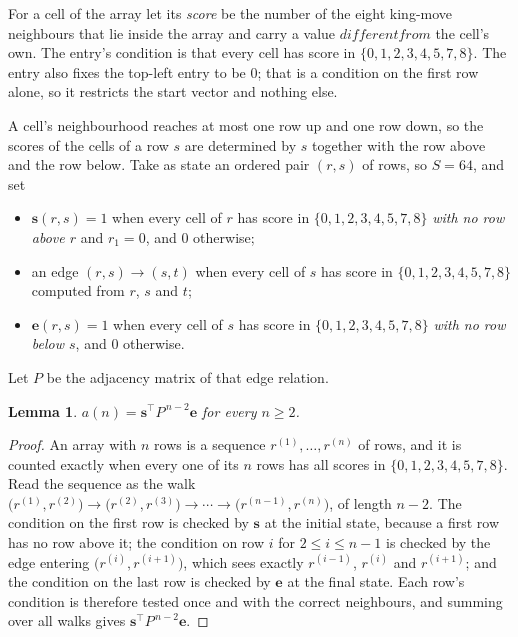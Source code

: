 \documentclass[11pt,a4paper]{article}
\theoremstyle{plain}
\newtheorem{lemma}[theorem]{Lemma}
\theoremstyle{definition}
\begin{document}
For a cell of the array let its \emph{score} be the number of the eight king-move neighbours that lie inside
the array and carry a value $different from$ the cell's own. The entry's condition is that every cell
has score in $\{0,1,2,3,4,5,7,8\}$. The entry also fixes the top-left entry to be $0$; that is a condition on the first row alone, so it restricts the start vector and nothing else.

A cell's neighbourhood reaches at most one row up and one row down, so the scores of the
cells of a row $s$ are determined by $s$ together with the row above and the row below.
Take as state an ordered pair $(r,s)$ of rows, so $S=64$, and set
\begin{itemize}
\item $\mathbf{s}(r,s)=1$ when every cell of $r$ has score in $\{0,1,2,3,4,5,7,8\}$ \emph{with no row
above $r$} and $r_1=0$, and $0$ otherwise;
\item an edge $(r,s)\to(s,t)$ when every cell of $s$ has score in $\{0,1,2,3,4,5,7,8\}$ computed from
$r$, $s$ and $t$;
\item $\mathbf{e}(r,s)=1$ when every cell of $s$ has score in $\{0,1,2,3,4,5,7,8\}$ \emph{with no row
below $s$}, and $0$ otherwise.
\end{itemize}
Let $P$ be the adjacency matrix of that edge relation.

\begin{lemma}\label{lem:walk}
$a(n)=\mathbf{s}^{\!\top}P^{\,n-2}\mathbf{e}$ for every $n\ge2$.
\end{lemma}

\begin{proof}
An array with $n$ rows is a sequence $r^{(1)},\dots,r^{(n)}$ of rows, and it is counted
exactly when every one of its $n$ rows has all scores in $\{0,1,2,3,4,5,7,8\}$. Read the sequence as the
walk $\bigl(r^{(1)},r^{(2)}\bigr)\to\bigl(r^{(2)},r^{(3)}\bigr)\to\cdots\to
\bigl(r^{(n-1)},r^{(n)}\bigr)$, of length $n-2$. The condition on the first row is
checked by $\mathbf{s}$ at the initial state, because a first row has no row above it; the
condition on row $i$ for $2\le i\le n-1$ is checked by the edge entering
$\bigl(r^{(i)},r^{(i+1)}\bigr)$, which sees exactly $r^{(i-1)}$, $r^{(i)}$ and
$r^{(i+1)}$; and the condition on the last row is checked by $\mathbf{e}$ at the final
state. Each row's condition is therefore tested once and with the correct neighbours, and
summing over all walks gives $\mathbf{s}^{\!\top}P^{\,n-2}\mathbf{e}$.
\end{proof}
\end{document}
